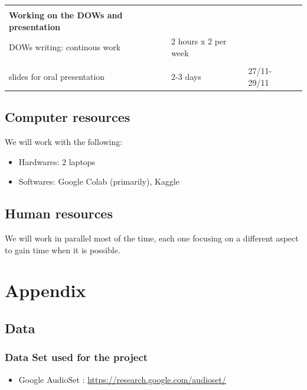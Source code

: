 \documentclass[11pt]{article}
\begin{document}
\begin{center}
\begin{tabular}{ |p{5cm}||p{3cm}|p{3cm}|p{2cm}|  }
                                                  &                      &             &      \\
    \textbf{Working on the DOWs and presentation} &                      &             &      \\
    DOWs writing: continous work                  & 2 hours x 2 per week &             &      \\
                                                  &                      &             &      \\
    slides for oral presentation                  & 2-3 days             & 27/11-29/11 &      \\
    \hline
  \end{tabular}
\end{center}



\subsection{Computer resources}

We will work with the following:
\begin{itemize}
  \item Hardwares: 2 laptops
  \item Softwares: Google Colab (primarily), Kaggle
\end{itemize}

\subsection{Human resources}

We will work in parallel most of the time, each one focusing on a different aspect to gain time when it is possible.

\pagebreak

\section{Appendix}

\subsection{Data}

\subsubsection*{Data Set used for the project}

\begin{itemize}
  \item Google AudioSet : \url{https://research.google.com/audioset/}
        \label{item:google-audioset}
\end{itemize}
\end{document}
